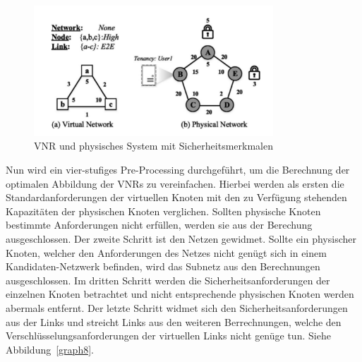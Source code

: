 \documentclass{lni}
\begin{document}
\begin{figure}[htb]
\begin{center}
\includegraphics[width=0.8\textwidth]{SVNR.pdf}\newline
\caption{\label{graph7}VNR und physisches System mit Sicherheitsmerkmalen \cite{wang2016towards}}
\end{center}
\end{figure}

Nun wird ein vier-stufiges Pre-Processing durchgeführt, um die Berechnung der optimalen Abbildung der VNRs zu vereinfachen. Hierbei werden als ersten die Standardanforderungen der virtuellen Knoten mit den zu Verfügung stehenden Kapazitäten der physischen Knoten verglichen. Sollten physische Knoten bestimmte Anforderungen nicht erfüllen, werden sie aus der Berechung ausgeschlossen. Der zweite Schritt ist den Netzen gewidmet. Sollte ein physischer Knoten, welcher den Anforderungen des Netzes nicht genügt sich in einem Kandidaten-Netzwerk befinden, wird das Subnetz aus den Berechnungen ausgeschlossen. Im dritten Schritt werden die Sicherheitsanforderungen der einzelnen Knoten betrachtet und nicht entsprechende physischen Knoten werden abermals entfernt. Der letzte Schritt widmet sich den Sicherheitsanforderungen aus der Links und streicht Links aus den weiteren Berrechnungen, welche den Verschlüsselungsanforderungen der virtuellen Links nicht genüge tun. Siehe Abbildung~\ref{graph8}.
\end{document}
